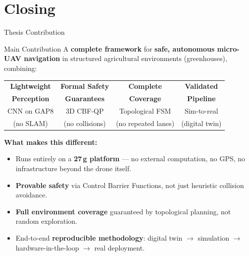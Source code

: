\documentclass[aspectratio=169, 11pt]{beamer}
\begin{document}
\section{Closing}

\begin{frame}{Thesis Contribution}

\begin{block}{\centering Main Contribution}
\centering\medskip
A \textbf{complete framework} for \textbf{safe, autonomous micro-UAV navigation} in structured agricultural environments (greenhouses), combining:\\[4pt]
\begin{tabular}{@{}c@{\quad}c@{\quad}c@{\quad}c@{}}
\textcolor{cnnblue}{\textbf{Lightweight}} & \textcolor{cbfgreen}{\textbf{Formal Safety}} & \textcolor{warnorange}{\textbf{Complete}} & \textbf{Validated}\\
\textcolor{cnnblue}{\textbf{Perception}} & \textcolor{cbfgreen}{\textbf{Guarantees}} & \textcolor{warnorange}{\textbf{Coverage}} & \textbf{Pipeline}\\[2pt]
\scriptsize CNN on GAP8 & \scriptsize 3D CBF-QP & \scriptsize Topological FSM & \scriptsize Sim-to-real\\
\scriptsize (no SLAM) & \scriptsize (no collisions) & \scriptsize (no repeated lanes) & \scriptsize (digital twin)\\
\end{tabular}
\medskip
\end{block}

\vspace{0.5em}
\textbf{What makes this different:}
\begin{itemize}
  \item Runs entirely on a \textbf{27\,g platform} --- no external computation, no GPS, no infrastructure beyond the drone itself.
  \item \textbf{Provable safety} via Control Barrier Functions, not just heuristic collision avoidance.
  \item \textbf{Full environment coverage} guaranteed by topological planning, not random exploration.
  \item End-to-end \textbf{reproducible methodology}: digital twin $\to$ simulation $\to$ hardware-in-the-loop $\to$ real deployment.
\end{itemize}
\end{frame}
\end{document}

